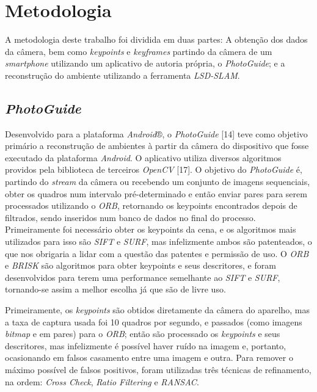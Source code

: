 \chapter{Metodologia}

A metodologia deste trabalho foi dividida em duas partes: A obtenção dos dados da câmera, bem como \textit{keypoints} e \textit{keyframes} partindo da câmera de um \textit{smartphone} utilizando um aplicativo de autoria própria, o \textit{PhotoGuide}; e a reconstrução do ambiente utilizando a ferramenta \textit{LSD-SLAM}.


\section{\textit{PhotoGuide}}

Desenvolvido para a plataforma \textit{Android}®, o \textit{PhotoGuide} [14] teve como objetivo primário a reconstrução de ambientes à partir da câmera do dispositivo que fosse executado da plataforma \textit{Android}. O aplicativo utiliza diversos algoritmos providos pela biblioteca de terceiros \textit{OpenCV} [17]. O objetivo do \textit{PhotoGuide} é, partindo do \textit{stream} da câmera ou recebendo um conjunto de imagens sequenciais, obter os quadros num intervalo pré-determinado e então enviar pares para serem processados utilizando o \textit{ORB}, retornando os keypoints encontrados depois de filtrados, sendo inseridos num banco de dados no final do processo.  Primeiramente foi necessário obter os keypoints da cena, e os algoritmos mais utilizados para isso são \textit{SIFT} e \textit{SURF}, mas infelizmente ambos são patenteados, o que nos obrigaria a lidar com a questão das patentes e permissão de uso. O \textit{ORB} e \textit{BRISK} são algoritmos para obter keypoints e seus descritores, e foram desenvolvidos para terem uma performance semelhante ao \textit{SIFT} e\textit{ SURF}, tornando-se assim a melhor escolha já que são de livre uso.

Primeiramente, os \textit{keypoints} são obtidos diretamente da câmera do aparelho, mas a taxa de captura usada foi 10 quadros por segundo, e passados (como imagens \textit{bitmap} e em pares) para o \textit{ORB}; então são processado os \textit{keypoints} e seus descritores, mas infelizmente é possível haver ruído na imagem e, portanto, ocasionando em falsos casamento entre uma imagem e outra. Para remover o máximo possível de falsos positivos, foram utilizadas três técnicas de refinamento, na ordem: \textit{Cross Check}, \textit{Ratio Filtering} e \textit{RANSAC}.

